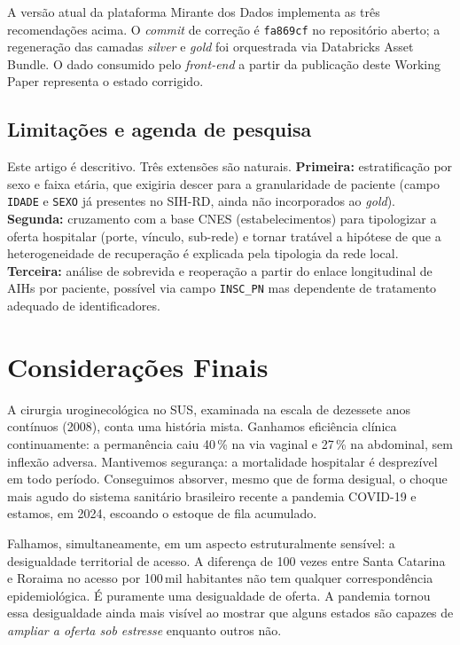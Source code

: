 \documentclass[12pt,a4paper,oneside]{article}
\begin{document}
A versão atual da plataforma Mirante dos Dados implementa as
três recomendações acima. O \textit{commit} de correção é
\texttt{fa869cf} no repositório aberto; a regeneração das camadas
\textit{silver} e \textit{gold} foi orquestrada via Databricks
Asset Bundle. O dado consumido pelo \textit{front-end} a partir
da publicação deste Working Paper representa o estado corrigido.

\subsection{Limitações e agenda de pesquisa}

Este artigo é descritivo. Três extensões são naturais.
\textbf{Primeira:} estratificação por sexo e faixa etária, que
exigiria descer para a granularidade de paciente (campo
\texttt{IDADE} e \texttt{SEXO} já presentes no SIH-RD, ainda
não incorporados ao \textit{gold}).
\textbf{Segunda:} cruzamento com a base CNES (estabelecimentos)
para tipologizar a oferta hospitalar (porte, vínculo, sub-rede)
e tornar tratável a hipótese de que a heterogeneidade de
recuperação é explicada pela tipologia da rede local.
\textbf{Terceira:} análise de sobrevida e reoperação a partir
do enlace longitudinal de AIHs por paciente, possível via
campo \texttt{INSC\_PN} mas dependente de tratamento adequado de
identificadores.

\section{Considerações Finais}\label{sec:conclusao}

A cirurgia uroginecológica no SUS, examinada na escala de
dezessete anos contínuos (2008), conta uma
história mista.
Ganhamos eficiência clínica continuamente: a permanência caiu
40\,\% na via vaginal e 27\,\% na abdominal, sem inflexão
adversa. Mantivemos segurança: a mortalidade hospitalar é
desprezível em todo período. Conseguimos absorver, mesmo que de
forma desigual, o choque mais agudo do sistema sanitário
brasileiro recente \textemdash{} a pandemia COVID-19 \textemdash{}
e estamos, em 2024, escoando o estoque de fila
acumulado.

Falhamos, simultaneamente, em um aspecto estruturalmente sensível:
a desigualdade territorial de acesso. A diferença de 100 vezes
entre Santa Catarina e Roraima no acesso por 100\,mil habitantes
não tem qualquer correspondência epidemiológica. É puramente
uma desigualdade de oferta. A pandemia tornou essa desigualdade
ainda mais visível ao mostrar que alguns estados são capazes de
\textit{ampliar a oferta sob estresse} enquanto outros não.
\end{document}

